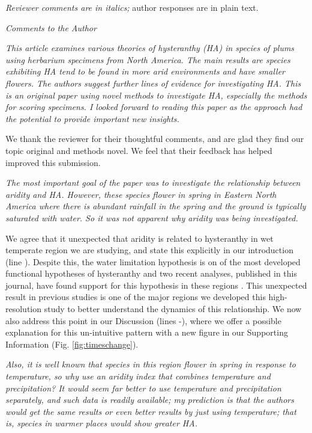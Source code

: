 \documentclass{article}[12pt]
\begin{document}


\emph{Reviewer comments are in italics;} author responses are in plain text.

\emph{Comments to the Author}

\emph{This article examines various theories of hysteranthy (HA) in species of plums using herbarium specimens from North America. The main results are species exhibiting HA tend to be found in more arid environments and have smaller flowers.  The authors suggest further lines of evidence for investigating HA. This is an original paper using novel methods to investigate HA, especially the methods for scoring specimens.  I looked forward to reading this paper as the approach had the potential to provide important new insights.}

We thank the reviewer for their thoughtful comments, and are glad they find our topic original and methods novel. We feel that their feedback has helped improved this submission.

\emph{The most important goal of the paper was to investigate the relationship between aridity and HA. However, these species flower in spring in Eastern North America where there is abundant rainfall in the spring and the ground is typically saturated with water. So it was not apparent why aridity was being investigated.}

We agree that it unexpected that aridity is related to hysteranthy in wet temperate region we are studying, and state this explicitly in our introduction (line ). Despite this, the water limitation hypothesis is on of the most developed functional hypotheses of hysteranthy and two recent analyses, published in this journal, have found support for this hypothesis in these regions \citep{Gougherty2018,Buonaiuto2020}. This unexpected result in previous studies is one of the major regions we developed this high-resolution study to better understand the dynamics of this relationship. We now also address this point in our Discussion (lines -), where we offer a possible explanation for this un-intuitive pattern with a new figure in our Supporting Information (Fig. \ref{fig:timeschange}).

\emph{Also, it is well known that species in this region flower in spring in response to temperature, so why use an aridity index that combines temperature and precipitation?  It would seem far better to use temperature and precipitation separately, and such data is readily available; my prediction is that the authors would get the same results or even better results by just using temperature; that is, species in warmer places would show greater HA.}
\end{document}
